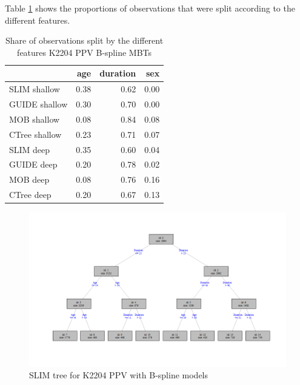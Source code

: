 Table \ref{tab:ins_k2204_ppv_bsplines_surrogates_share} shows the proportions of observations that were split according to the different features. 


\begin{table}[!htb]
\centering \scriptsize
\begin{tabular}[t]{l|r|r|r}
\hline
  & age & duration & sex\\
\hline
SLIM shallow & 0.38 & 0.62 & 0.00\\
GUIDE shallow & 0.30 & 0.70 & 0.00\\
MOB shallow & 0.08 & 0.84 & 0.08\\
CTree shallow & 0.23 & 0.71 & 0.07\\
\hline
SLIM deep & 0.35 & 0.60 & 0.04\\
GUIDE deep & 0.20 & 0.78 & 0.02\\
MOB deep & 0.08 & 0.76 & 0.16\\
CTree deep & 0.20 & 0.67 & 0.13\\
\hline
\end{tabular}
\label{tab:ins_k2204_ppv_bsplines_surrogates_share}
\caption{Share of observations split by the different features K2204 PPV B-spline MBTs}
\end{table}



\begin{figure}[!htb]
    \centering   
    \includegraphics[width = 16cm]{Figures/insurance_use_case/k2204_PPV/slim_bsplines_small_tree.png}
    \caption{SLIM tree for K2204 PPV with B-spline models}
    \label{fig:ins_k2204_ppv_slim_bsplines_tree}
\end{figure}




